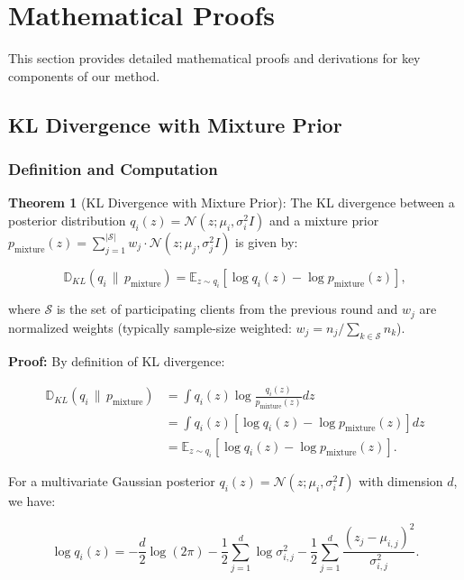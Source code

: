 \section{Mathematical Proofs}
\label{app:proofs}

This section provides detailed mathematical proofs and derivations for key components of our method.

\subsection{KL Divergence with Mixture Prior}

\subsubsection{Definition and Computation}

\textbf{Theorem 1} (KL Divergence with Mixture Prior): The KL divergence between a posterior distribution $q_i(z) = \mathcal{N}(z; \mu_i, \sigma_i^2 I)$ and a mixture prior $p_{\text{mixture}}(z) = \sum_{j=1}^{|\mathcal{S}|} w_j \cdot \mathcal{N}(z; \mu_j, \sigma_j^2 I)$ is given by:

\begin{equation}
\mathbb{D}_{KL}(q_i \,\|\, p_{\text{mixture}}) = \mathbb{E}_{z \sim q_i} \left[ \log q_i(z) - \log p_{\text{mixture}}(z) \right],
\end{equation}

where $\mathcal{S}$ is the set of participating clients from the previous round and $w_j$ are normalized weights (typically sample-size weighted: $w_j = n_j / \sum_{k \in \mathcal{S}} n_k$).

\textbf{Proof:} By definition of KL divergence:

\begin{align}
\mathbb{D}_{KL}(q_i \,\|\, p_{\text{mixture}}) &= \int q_i(z) \log \frac{q_i(z)}{p_{\text{mixture}}(z)} dz \nonumber \\
&= \int q_i(z) \left[ \log q_i(z) - \log p_{\text{mixture}}(z) \right] dz \nonumber \\
&= \mathbb{E}_{z \sim q_i} \left[ \log q_i(z) - \log p_{\text{mixture}}(z) \right].
\end{align}

For a multivariate Gaussian posterior $q_i(z) = \mathcal{N}(z; \mu_i, \sigma_i^2 I)$ with dimension $d$, we have:

\begin{equation}
\log q_i(z) = -\frac{d}{2}\log(2\pi) - \frac{1}{2}\sum_{j=1}^{d} \log\sigma_{i,j}^2 - \frac{1}{2}\sum_{j=1}^{d} \frac{(z_j - \mu_{i,j})^2}{\sigma_{i,j}^2}.
\end{equation}

